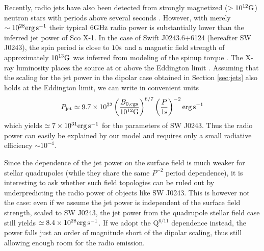\documentclass[fleqn,usenatbib]{mnras}
\begin{document}
Recently, radio jets have also been detected from strongly magnetized ($>10^{12}\rm G$) neutron stars with periods above several seconds \citep{Eijnden2018,Eijnden2021}.  However, with merely $\sim10^{28}\rm erg\, s^{-1}$ their typical $6\rm GHz $ radio power is substantially lower than the inferred jet power of Sco X-1.  In the case of Swift J0243.6+6124 (hereafter SW J0243), the spin period is close to $10\rm s$ and a magnetic field strength of approximately $10^{13}\rm G$ was inferred from modeling of the spinup torque \citep{DoroshenkoEtAl2018Fixed}.  The X-ray luminosity places the source at or above the Eddington limit \citep{Eijnden2018}.  
Assuming that the scaling for the jet power in the dipolar case obtained in Section \ref{sec:jets} also holds at the Eddington limit, we can write in convenient units
\begin{align}
    P_{\rm jet} \simeq 9.7\times 10^{32} \left(\frac{B_{0,\rm cgs}}{10^{12}\rm G}\right)^{6/7} \left(\frac{P}{1\rm s}\right)^{-2}\rm erg\, s^{-1}
\end{align}
which yields $\simeq 7\times 10^{31}\rm erg\, s^{-1}$ for the parameters of SW J0243.  Thus the radio power can easily be explained by our model and requires only a small radiative efficiency $\sim 10^{-4}$.  

Since the dependence of the jet power on the surface field is much weaker for stellar quadrupoles (while they share the same $P^{-2}$ period dependence), it is interesting to ask whether such field topologies can be ruled out by underpredicting the radio power of objects like SW J0243.  This is however not the case: even if we assume the jet power is independent of the surface field strength, scaled to SW J0243, the jet power from the quadrupole stellar field case still yields $\simeq 8.4\times 10^{28}\rm erg\, s^{-1}$.  If we adopt the Q$^{6/11}$ dependence instead, the power falls just an order of magnitude short of the dipolar scaling, thus still allowing enough room for the radio emission.   
\end{document}
